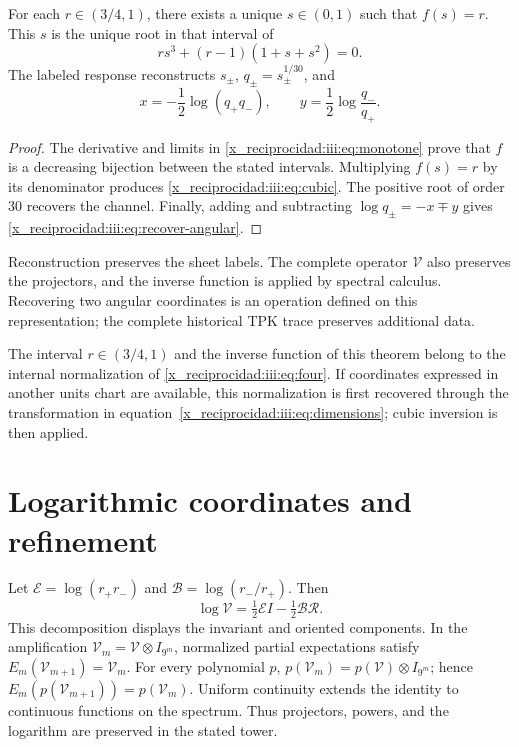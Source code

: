 \begin{theorem}
For each $r\in(3/4,1)$, there exists a unique $s\in(0,1)$ such that $f(s)=r$.
This $s$ is the unique root in that interval of
\begin{equation}
 r s^3+(r-1)(1+s+s^2)=0.
 \label{x_reciprocidad:iii:eq:cubic}
\end{equation}
The labeled response reconstructs $s_\pm$, $q_\pm=s_\pm^{1/30}$, and
\begin{equation}
 x=-\frac12\log(q_+q_-),\qquad
 y=\frac12\log\frac{q_-}{q_+}.
 \label{x_reciprocidad:iii:eq:recover-angular}
\end{equation}
\end{theorem}
\begin{proof}
The derivative and limits in \eqref{x_reciprocidad:iii:eq:monotone} prove that $f$ is a
decreasing bijection between the stated intervals. Multiplying $f(s)=r$
by its denominator produces \eqref{x_reciprocidad:iii:eq:cubic}. The positive root of order
$30$ recovers the channel. Finally, adding and subtracting
$\log q_\pm=-x\mp y$ gives \eqref{x_reciprocidad:iii:eq:recover-angular}.
\end{proof}

Reconstruction preserves the sheet labels. The complete operator
$\mathcal V$ also preserves the projectors, and the inverse function is applied
by spectral calculus. Recovering two angular coordinates is an
operation defined on this representation; the complete historical
TPK trace preserves additional data.

The interval $r\in(3/4,1)$ and the inverse function of this theorem belong
to the internal normalization of \eqref{x_reciprocidad:iii:eq:four}. If coordinates
expressed in another units chart are available, this normalization
is first recovered through the transformation in
equation~\eqref{x_reciprocidad:iii:eq:dimensions}; cubic inversion is then applied.

\section{Logarithmic coordinates and refinement}

Let $\mathcal E=\log(r_+r_-)$ and $\mathcal B=\log(r_-/r_+)$. Then
\begin{equation}
 \log\mathcal V=\tfrac12\mathcal E I-\tfrac12\mathcal B\mathcal R.
 \label{x_reciprocidad:iii:eq:logvac}
\end{equation}
This decomposition displays the invariant and oriented components.
In the amplification $\mathcal V_m=\mathcal V\otimes I_{9^m}$, normalized
partial expectations satisfy
$E_m(\mathcal V_{m+1})=\mathcal V_m$. For every polynomial $p$,
$p(\mathcal V_m)=p(\mathcal V)\otimes I_{9^m}$; hence
$E_m(p(\mathcal V_{m+1}))=p(\mathcal V_m)$. Uniform continuity
extends the identity to continuous functions on the spectrum.
Thus projectors, powers, and the logarithm are preserved in the stated tower.

